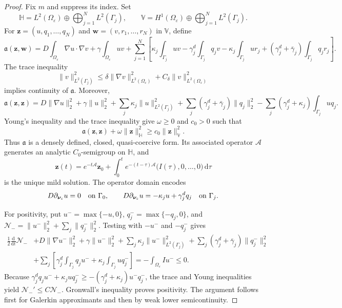 \documentclass[10pt,a4paper]{amsart}
\begin{document}
\begin{proof}
Fix $m$ and suppress its index. Set
\[
\mathbb H=L^2(\Omega_\varepsilon)\oplus
\bigoplus_{j=1}^N L^2(\Gamma_j),\qquad
\mathbb V=H^1(\Omega_\varepsilon)\oplus
\bigoplus_{j=1}^N L^2(\Gamma_j).
\]
For $\mathbf z=(u,q_1,\ldots,q_N)$ and
$\mathbf w=(v,r_1,\ldots,r_N)$ in $\mathbb V$, define
\begin{equation}
\mathfrak a(\mathbf z,\mathbf w)
=D\int_{\Omega_\varepsilon}\nabla u\cdot\nabla v
+\gamma\int_{\Omega_\varepsilon}uv +\sum_{j=1}^N\left[
\kappa_j\int_{\Gamma_j}uv
-\gamma^d_j\int_{\Gamma_j}q_jv
-\kappa_j\int_{\Gamma_j}ur_j
+(\gamma^d_j+\bar\gamma_j)\int_{\Gamma_j}q_jr_j
\right].
\label{eq:appendix_form}
\end{equation}
The trace inequality
\[
\|v\|_{L^2(\Gamma_j)}^2
\leq \delta\|\nabla v\|_{L^2(\Omega_\varepsilon)}^2
+C_\delta\|v\|_{L^2(\Omega_\varepsilon)}^2
\]
implies continuity of $\mathfrak a$. Moreover,
\begin{equation}
\mathfrak a(\mathbf z,\mathbf z)
=D\|\nabla u\|_2^2+\gamma\|u\|_2^2
+\sum_j\kappa_j\|u\|_{L^2(\Gamma_j)}^2
+\sum_j(\gamma^d_j+\bar\gamma_j)\|q_j\|_2^2 -\sum_j(\gamma^d_j+\kappa_j)\int_{\Gamma_j}u q_j.
\end{equation}
Young's inequality and the trace inequality give $\omega\geq0$ and $c_0>0$
such that
\[
\mathfrak a(\mathbf z,\mathbf z)+\omega\|\mathbf z\|_{\mathbb H}^2
\geq c_0\|\mathbf z\|_{\mathbb V}^2.
\]
Thus $\mathfrak a$ is a densely defined, closed, quasi-coercive form. Its
associated operator $\mathcal A$ generates an analytic $C_0$-semigroup on
$\mathbb H$, and
\begin{equation}
\mathbf z(t)=e^{-t\mathcal A}\mathbf z_0+
\int_0^t e^{-(t-\tau)\mathcal A}
\bigl(I(\tau),0,\ldots,0\bigr)\,\mathrm d\tau
\label{eq:appendix_mild}
\end{equation}
is the unique mild solution. The operator domain encodes
\[
D\partial_{\boldsymbol\nu_\varepsilon}u=0\quad\hbox{on }\Gamma_0,
\qquad
D\partial_{\boldsymbol\nu_\varepsilon}u=-\kappa_j u+\gamma^d_jq_j
\quad\hbox{on }\Gamma_j.
\]

For positivity, put $u^-=\max\{-u,0\}$,
$q_j^-=\max\{-q_j,0\}$, and
$\mathcal N_-=\|u^-\|_2^2+\sum_j\|q_j^-\|_2^2$. Testing with
$-u^-$ and $-q_j^-$ gives
\begin{align}
\frac12\frac{\mathrm d}{\mathrm dt}\mathcal N_-
&+D\|\nabla u^-\|_2^2+\gamma\|u^-\|_2^2
+\sum_j\kappa_j\|u^-\|_{L^2(\Gamma_j)}^2
+\sum_j(\gamma^d_j+\bar\gamma_j)\|q_j^-\|_2^2 \nonumber\\
&+\sum_j\left[
\gamma^d_j\int_{\Gamma_j}q_j u^-
+\kappa_j\int_{\Gamma_j}u q_j^-
\right]
=-\int_{\Omega_\varepsilon}Iu^-\leq0.
\label{eq:appendix_negative}
\end{align}
Because
$\gamma^d_jq_ju^-+\kappa_juq_j^-
\geq-(\gamma^d_j+\kappa_j)u^-q_j^-$, the trace and Young inequalities yield
$\mathcal N_-'\leq C\mathcal N_-$. Gronwall's inequality proves positivity.
The argument follows first for Galerkin approximants and then by weak lower
semicontinuity.
\end{proof}
\end{document}
